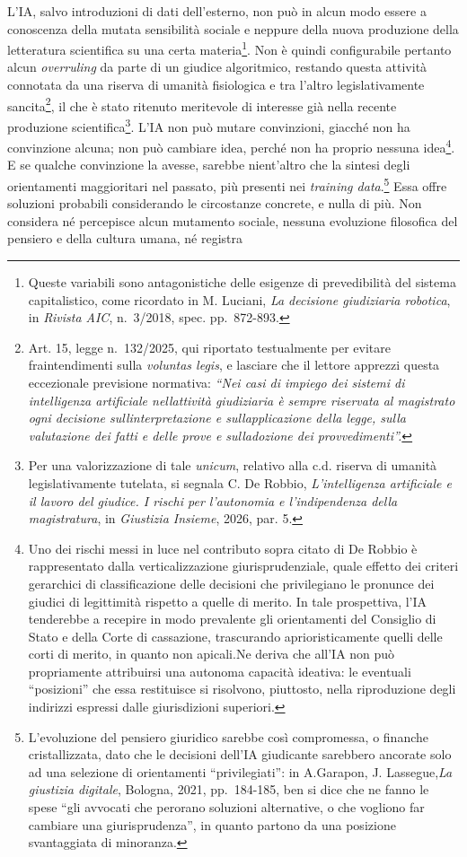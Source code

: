 \documentclass[american,a4paper,]{article}
\begin{document}
L'IA, salvo introduzioni di dati dell'esterno, non può in alcun modo essere a conoscenza della mutata sensibilità sociale e neppure della nuova produzione della letteratura scientifica su una certa materia\footnote{Queste variabili sono antagonistiche delle esigenze di prevedibilità del sistema capitalistico, come ricordato in M. Luciani, \emph{La decisione giudiziaria robotica}, in \emph{Rivista AIC}, n.~3/2018, spec. pp.~872-893.}. Non è quindi configurabile pertanto alcun \emph{overruling} da parte di un giudice algoritmico, restando questa attività connotata da una riserva di umanità fisiologica e tra l'altro legislativamente sancita\footnote{Art. 15, legge n.~132/2025, qui riportato testualmente per evitare fraintendimenti sulla \emph{voluntas legis}, e lasciare che il lettore apprezzi questa eccezionale previsione normativa: \emph{``\emph{Nei casi di impiego dei sistemi di intelligenza artificiale nell\textquotesingle attività giudiziaria è sempre riservata al magistrato ogni decisione sull\textquotesingle interpretazione e sull\textquotesingle applicazione della legge, sulla valutazione dei fatti e delle prove e sull\textquotesingle adozione dei provvedimenti}''.}}, il che è stato ritenuto meritevole di interesse già nella recente produzione scientifica\footnote{Per una valorizzazione di tale \emph{unicum}, relativo alla c.d. riserva di umanità legislativamente tutelata, si segnala C. De Robbio, \emph{L'intelligenza artificiale e il lavoro del giudice. I rischi per l'autonomia e l'indipendenza della magistratura}, in \emph{Giustizia Insieme}, 2026, par. 5.}. L'IA non può mutare convinzioni, giacché non ha convinzione alcuna; non può cambiare idea, perché non ha proprio nessuna idea\footnote{Uno dei rischi messi in luce nel contributo sopra citato di De Robbio è rappresentato dalla verticalizzazione giurisprudenziale, quale effetto dei criteri gerarchici di classificazione delle decisioni che privilegiano le pronunce dei giudici di legittimità rispetto a quelle di merito. In tale prospettiva, l'IA tenderebbe a recepire in modo prevalente gli orientamenti del Consiglio di Stato e della Corte di cassazione, trascurando aprioristicamente quelli delle corti di merito, in quanto non apicali.Ne deriva che all'IA non può propriamente attribuirsi una autonoma capacità ideativa: le eventuali ``posizioni'' che essa restituisce si risolvono, piuttosto, nella riproduzione degli indirizzi espressi dalle giurisdizioni superiori.}. E se qualche convinzione la avesse, sarebbe nient'altro che la sintesi degli orientamenti maggioritari nel passato, più presenti nei \emph{training data}.\footnote{L'evoluzione del pensiero giuridico sarebbe così compromessa, o finanche cristallizzata, dato che le decisioni dell'IA giudicante sarebbero ancorate solo ad una selezione di orientamenti ``privilegiati'': in A.Garapon, J. Lassegue,\emph{La giustizia digitale}, Bologna, 2021, pp.~184-185, ben si dice che ne fanno le spese ``gli avvocati che perorano soluzioni alternative, o che vogliono far cambiare una giurisprudenza'', in quanto partono da una posizione svantaggiata di minoranza.} Essa offre soluzioni probabili considerando le circostanze concrete, e nulla di più. Non considera né percepisce alcun mutamento sociale, nessuna evoluzione filosofica del pensiero e della cultura umana, né registra 
\end{document}
